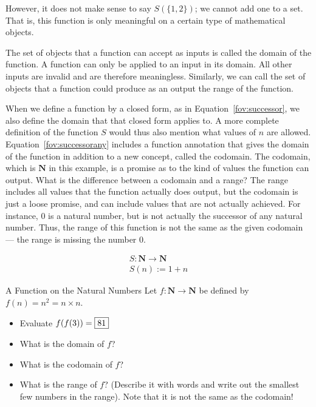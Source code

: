 \documentclass[a4paper,10pt]{report}
\begin{document}
However, it does not make sense to say \(S(\{1, 2\})\); we cannot add one to a set. That is,
this function is only meaningful on a certain type of mathematical objects.

The set of objects that a function can accept as inputs is called the \gls{domain} of the
function. A function can only be applied to an input in its domain. All other inputs are
invalid and are therefore meaningless. Similarly, we can call the set of objects that a
function could produce as an output the \gls{range} of the function.

When we define a function by a closed form, as in Equation~\ref{fov:successor}, we also
define the domain that that closed form applies to. A more complete definition of the
function \(S\) would thus also mention what values of \(n\) are allowed.
Equation~\ref{fov:successorany} includes a function annotation that gives the domain of the
function in addition to a new concept, called the codomain. The codomain, which is
\(\mathbf{N}\) in this example, is a promise as to the kind of values the function can
output. What is the difference between a codomain and a range? The range includes all values
that the function actually does output, but the codomain is just a loose promise, and can
include values that are not actually achieved. For instance, \(0\) is a natural number, but
is not actually the successor of any natural number. Thus, the range of this function is
not the same as the given codomain --- the range is missing the number \(0\).

\begin{equation}
  \begin{array}{l}
    S: \mathbf{N} \to \mathbf{N} \\
    S(n) := 1 + n
  \end{array}
  \label{fov:successorany}
\end{equation}

\begin{problem}{A Function on the Natural Numbers}
  Let \(f: \mathbf{N} \to \mathbf{N}\) be defined by \(f(n) = n^2 = n\times n\).

  \begin{itemize}
    \item Evaluate \(f(f(3)) = \Ans{81}\)
    \item What is the domain of \(f\)? \hfill {}
    \item What is the codomain of \(f\)? \hfill {}
    \item What is the range of \(f\)? (Describe it with words and write out the smallest few
    numbers in the range). Note that it is not the same
    as the codomain!
  \end{itemize}
\end{problem}
\end{document}
